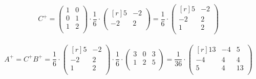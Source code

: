 \documentclass[12pt]{article}
\theoremstyle{definition}
\numberwithin{equation}{section}
\begin{document}
	\[C^+ = \begin{pmatrix}
	1 & 0 \\         
	0 & 1 \\
	1 & 2 \\
	\end{pmatrix} \cdot \frac{1}{6} \cdot \begin{pmatrix}[r]
	5 & -2 \\         
	-2 & 2 \\
	\end{pmatrix} = \frac{1}{6} \cdot \begin{pmatrix}[r]
	5 & -2 \\         
	-2 & 2 \\
	1 & 2 \\
	\end{pmatrix}\]\\
	\[A^+ = C^+B^+ = \frac{1}{6} \cdot \begin{pmatrix}[r]
	5 & -2 \\         
	-2 & 2 \\
	1 & 2 \\
	\end{pmatrix} \cdot \frac{1}{6} \cdot \begin{pmatrix}
	3 & 0 & 3 \\         
	1 & 2 & 5 \\
	\end{pmatrix} = \frac{1}{36} \cdot \begin{pmatrix}[r]
	13 & -4 & 5 \\         
	-4 & 4 & 4 \\
	5 & 4 & 13 \\
	\end{pmatrix}\]\\
	\\
\end{document}
